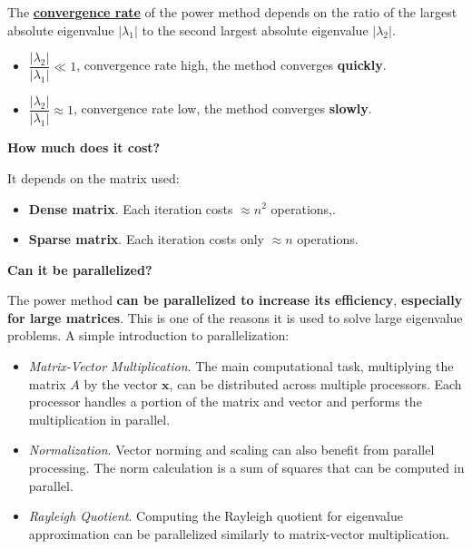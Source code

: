 \highspace
The \textbf{\underline{convergence rate}} of the power method depends on the ratio of the largest absolute eigenvalue $\left|\lambda_{1}\right|$ to the second largest absolute eigenvalue $\left|\lambda_{2}\right|$.
\begin{itemize}
    \item $\dfrac{\left|\lambda_{2}\right|}{\left|\lambda_{1}\right|} \ll 1$, convergence rate high, the method converges \textbf{quickly}.
    \item $\dfrac{\left|\lambda_{2}\right|}{\left|\lambda_{1}\right|} \approx 1$, convergence rate low, the method converges \textbf{slowly}.
\end{itemize}

\highspace
\begin{flushleft}
    \textcolor{Red2}{ \textbf{How much does it cost?}}
\end{flushleft}
It depends on the matrix used:
\begin{itemize}
    \item \textbf{Dense matrix}. Each iteration costs $\approx n^{2}$ operations,.
    \item \textbf{Sparse matrix}. Each iteration costs only $\approx n$ operations.
\end{itemize}

\highspace
\begin{flushleft}
    \textcolor{Green3}{ \textbf{Can it be parallelized?}}
\end{flushleft}
The power method \textbf{can be parallelized to increase its efficiency}, \textbf{especially for large matrices}. This is one of the reasons it is used to solve large eigenvalue problems. A simple introduction to parallelization:
\begin{itemize}
    \item \emph{Matrix-Vector Multiplication}. The main computational task, multiplying the matrix $A$ by the vector $\mathbf{x}$, can be distributed across multiple processors. Each processor handles a portion of the matrix and vector and performs the multiplication in parallel.

    \item \emph{Normalization}. Vector norming and scaling can also benefit from parallel processing. The norm calculation is a sum of squares that can be computed in parallel.
    
    \item \emph{Rayleigh Quotient}. Computing the Rayleigh quotient for eigenvalue approximation can be parallelized similarly to matrix-vector multiplication.
\end{itemize}
